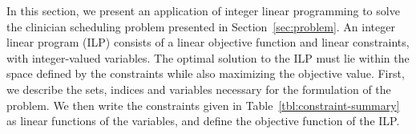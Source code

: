 In this section, we present an application of integer linear programming to solve the clinician
scheduling problem presented in Section~\ref{sec:problem}. 
An integer linear program (ILP) consists of a linear objective function and linear constraints,
with integer-valued variables. The optimal solution to the ILP must lie within the space
defined by the constraints while also maximizing the objective value.
First, we describe
the sets, indices and variables necessary for the formulation of the problem. We
then write the constraints given in Table~\ref{tbl:constraint-summary} as
linear functions of the variables, and define the objective function of the ILP.

